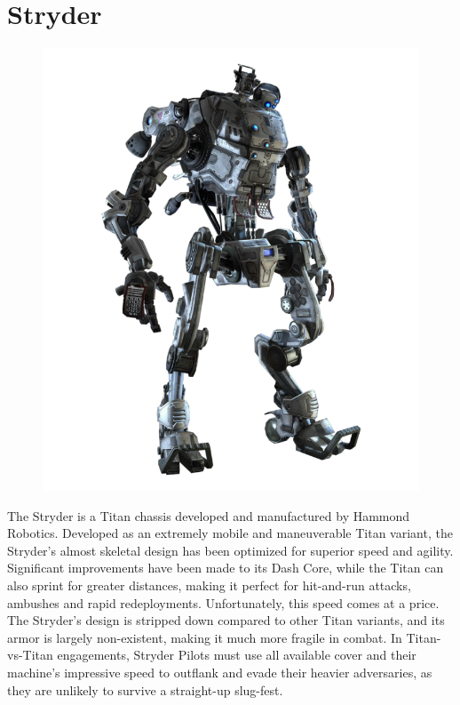 \documentclass[9pt, openany]{extbook}
\begin{document}
\section{Stryder}
\label{sec:stryder}
\begin{figure}
\vspace*{-2em}
\includegraphics[width=\linewidth]{Stryder}
\end{figure}


The Stryder is a Titan chassis developed and manufactured by Hammond Robotics. Developed as an extremely mobile and maneuverable Titan variant, the Stryder's almost skeletal design has been optimized for superior speed and agility. Significant improvements have been made to its Dash Core, while the Titan can also sprint for greater distances, making it perfect for hit-and-run attacks, ambushes and rapid redeployments. Unfortunately, this speed comes at a price. The Stryder's design is stripped down compared to other Titan variants, and its armor is largely non-existent, making it much more fragile in combat. In Titan-vs-Titan engagements, Stryder Pilots must use all available cover and their machine's impressive speed to outflank and evade their heavier adversaries, as they are unlikely to survive a straight-up slug-fest.
\end{document}

